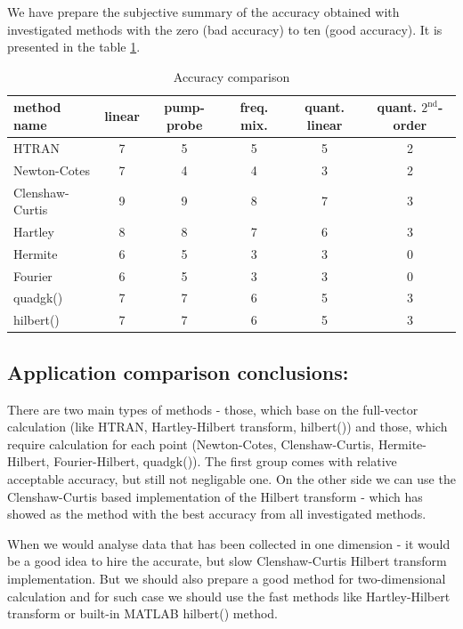 \documentclass[12pt,twoside,a4paper]{article}
\numberwithin{equation}{subsection}
\numberwithin{figure}{subsection}
\begin{document}
We have prepare the subjective summary of the accuracy obtained with investigated methods with the zero (bad accuracy) to ten
(good accuracy). It is presented in the table \ref{gencom_accuracy}.


\begin{table}
  \caption{Accuracy comparison} \label{gencom_accuracy} 
  \begin{tabular}{l | c | c | c | c | c}
    method name  &  linear  &  pump-probe  &  freq. mix.  &  quant. linear  &  quant. $2^{\text{nd}}$-order \\
    \hline
    HTRAN            &  7  &  5  &  5  &  5  &  2  \\
    Newton-Cotes     &  7  &  4  &  4  &  3  &  2  \\
    Clenshaw-Curtis  &  9  &  9  &  8  &  7  &  3  \\
    Hartley          &  8  &  8  &  7  &  6  &  3  \\
    Hermite          &  6  &  5  &  3  &  3  &  0  \\
    Fourier          &  6  &  5  &  3  &  3  &  0  \\
    quadgk()         &  7  &  7  &  6  &  5  &  3  \\
    hilbert()        &  7  &  7  &  6  &  5  &  3  \\
    \hline
  \end{tabular}
\end{table}


\subsection{Application comparison conclusions:} \label{chap:gencom_application}


There are two main types of methods - those, which base on the full-vector calculation (like HTRAN, Hartley-Hilbert
transform, hilbert()) and those, which require calculation for each point (Newton-Cotes, Clenshaw-Curtis, Hermite-Hilbert,
Fourier-Hilbert, quadgk()). The first group comes with relative acceptable accuracy, but still not negligable one. On the other
side we can use the Clenshaw-Curtis based implementation of the Hilbert transform - which has showed as the method with the
best accuracy from all investigated methods.

When we would analyse data that has been collected in one dimension - it would be a good idea to hire the accurate, but slow
Clenshaw-Curtis Hilbert transform implementation. But we should also prepare a good method for two-dimensional calculation and for
such case we should use the fast methods like Hartley-Hilbert transform or built-in MATLAB \textregistered hilbert() method.
\end{document}

